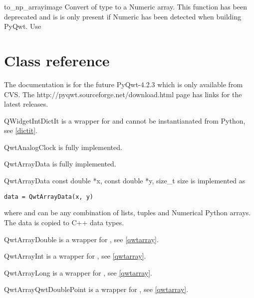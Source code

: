 \documentclass{manual}
\newcommand{\Download}{\ulink{download}
  {http://pyqwt.sourceforge.net/download.html}}
\newcommand{\Future}{
  \begin{notice}[warning]
    The documentation is for the future PyQwt-4.2.3 which is only available
    from CVS. The \Download{} page has links for the latest releases.
  \end{notice}
}
\begin{document}
\begin{funcdesc}{to_np_array}{image}
  Convert  of type  to a Numeric array. This function
  has been deprecated and is is only present if Numeric has been detected when
  building PyQwt. Use 
\end{funcdesc}


\section{Class reference \label{classes}}

\Future{}


\begin{classdesc*}{QWidgetIntDictIt}
  is a wrapper for  and cannot be instantianated from
  Python, see \ref{dictit}.
\end{classdesc*}

\begin{classdesc*}{QwtAnalogClock}
  is fully implemented.
\end{classdesc*}

\begin{classdesc*}{QwtArrayData}
  is fully implemented.

  \begin{cfuncdesc}{}{QwtArrayData}{
      const double *x, const double *y, size_t size}
    is implemented as
    \begin{verbatim}
data = QwtArrayData(x, y)
    \end{verbatim}
    where  and  can be any combination of lists, tuples and
    Numerical Python arrays.  The data is copied to C++ data types.
  \end{cfuncdesc}
\end{classdesc*}

\begin{classdesc*}{QwtArrayDouble}
  is a wrapper for , see \ref{qwtarray}.
\end{classdesc*}

\begin{classdesc*}{QwtArrayInt}
  is a wrapper for , see \ref{qwtarray}.
\end{classdesc*}

\begin{classdesc*}{QwtArrayLong}
  is a wrapper for , see \ref{qwtarray}.
\end{classdesc*}

\begin{classdesc*}{QwtArrayQwtDoublePoint}
  is a wrapper for , see \ref{qwtarray}.
\end{classdesc*}
\end{document}
